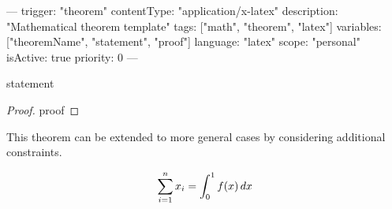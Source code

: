 ---
trigger: "theorem"
contentType: "application/x-latex"
description: "Mathematical theorem template"
tags: ["math", "theorem", "latex"]
variables: ["theoremName", "statement", "proof"]
language: "latex"
scope: "personal"
isActive: true
priority: 0
---
\begin{theorem}[{theoremName}]
\label{thm:{theoremName}}
{statement}
\end{theorem}

\begin{proof}
{proof}
\end{proof}

\begin{remark}
This theorem can be extended to more general cases by considering additional constraints.
\end{remark}

\begin{equation}
\label{eq:{theoremName}}
\sum_{i=1}^{n} x_i = \int_0^1 f(x) \, dx
\end{equation}